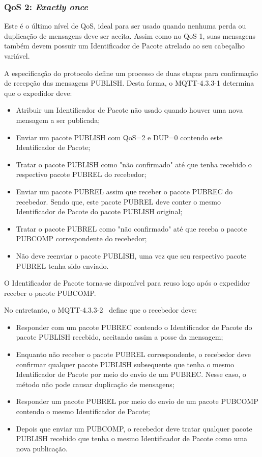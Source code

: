 \subsubsection*{QoS 2: \textit{Exactly once}}

Este é o último nível de QoS, ideal para ser usado quando nenhuma perda ou duplicação de mensagens deve ser aceita. Assim como no QoS 1, suas mensagens também devem possuir um Identificador de Pacote atrelado ao seu cabeçalho variável.

A especificação do protocolo define um processo de duas etapas para confirmação de recepção das mensagens PUBLISH. Desta forma, o MQTT-4.3.3-1 determina que o expedidor deve:
\begin{itemize}
	\item Atribuir um Identificador de Pacote não usado quando houver uma nova mensagem a ser publicada;
	\item Enviar um pacote PUBLISH com QoS=2 e DUP=0 contendo este Identificador de Pacote;
	\item Tratar o pacote PUBLISH como "não confirmado" até que tenha recebido o respectivo pacote PUBREL do recebedor;
	\item Enviar um pacote PUBREL assim que receber o pacote PUBREC do recebedor. Sendo que, este pacote PUBREL deve conter o mesmo Identificador de Pacote do pacote PUBLISH original;
	\item Tratar o pacote PUBREL como "não confirmado" até que receba o pacote PUBCOMP correspondente do recebedor;
	\item Não deve reenviar o pacote PUBLISH, uma vez que seu respectivo pacote PUBREL tenha sido enviado.
\end{itemize}

O Identificador de Pacote torna-se disponível para reuso logo após o expedidor receber o pacote PUBCOMP.

No entretanto, o MQTT-4.3.3-2~\cite{mqttv3.1.1} define que o recebedor deve:
\begin{itemize}
	\item Responder com um pacote PUBREC contendo o Identificador de Pacote do pacote PUBLISH recebido, aceitando assim a posse da mensagem;
	\item Enquanto não receber o pacote PUBREL correspondente, o recebedor deve confirmar qualquer pacote PUBLISH subsequente que tenha o mesmo Identificador de Pacote por meio do envio de um PUBREC. Nesse caso, o método não pode causar duplicação de mensagens;
	\item Responder um pacote PUBREL por meio do envio de um pacote PUBCOMP contendo o mesmo Identificador de Pacote;
	\item Depois que enviar um PUBCOMP, o recebedor deve tratar qualquer pacote PUBLISH recebido que tenha o mesmo Identificador de Pacote como uma nova publicação.
\end{itemize}


